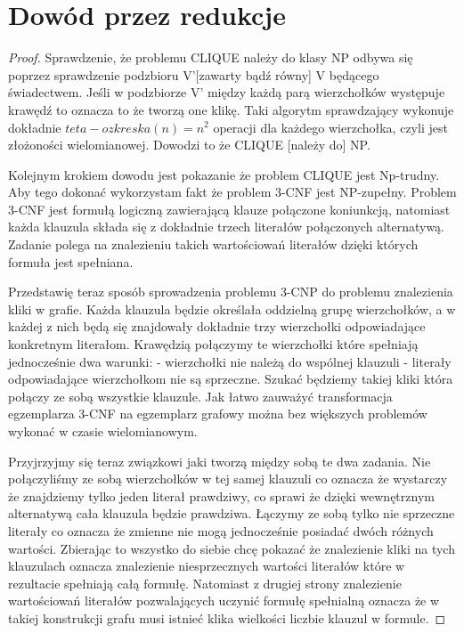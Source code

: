 \section{Dowód przez redukcje}
\begin{proof}
Sprawdzenie, że problemu CLIQUE należy do klasy NP odbywa się poprzez sprawdzenie podzbioru V'[zawarty bądź równy] V będącego świadectwem. Jeśli w podzbiorze V' między każdą parą wierzchołków występuje krawędź to oznacza to że tworzą one klikę. Taki algorytm sprawdzający wykonuje dokładnie  $teta - o zkreska(n) = n^2$ operacji dla każdego wierzchołka, czyli jest złożoności wielomianowej. Dowodzi to że CLIQUE [należy do] NP.

Kolejnym krokiem dowodu jest pokazanie że problem CLIQUE jest Np-trudny. Aby tego dokonać wykorzystam fakt że problem 3-CNF jest NP-zupełny. Problem 3-CNF jest formułą logiczną zawierającą klauze połączone koniunkcją, natomiast każda klauzula składa się z dokładnie trzech literałów połączonych alternatywą. Zadanie polega na znalezieniu takich wartościowań literałów dzięki których formuła jest spełniana. 

Przedstawię teraz sposób sprowadzenia problemu 3-CNP do problemu znalezienia kliki w grafie. Każda klauzula będzie określała oddzielną grupę wierzchołków, a w każdej z nich będą się znajdowały dokładnie trzy wierzchołki odpowiadające konkretnym literałom. Krawędzią połączymy te wierzchołki które spełniają jednocześnie dwa warunki:
- wierzchołki nie należą do wspólnej klauzuli
- literały odpowiadające wierzchołkom nie są sprzeczne.
 Szukać będziemy takiej kliki która połączy ze sobą wszystkie klauzule. Jak łatwo zauważyć transformacja egzemplarza 3-CNF na egzemplarz grafowy można bez większych problemów wykonać w czasie wielomianowym.

Przyjrzyjmy się teraz związkowi jaki tworzą między sobą te dwa zadania. Nie połączyliśmy ze sobą wierzchołków w tej samej klauzuli co oznacza że wystarczy że znajdziemy tylko jeden literał prawdziwy, co sprawi że dzięki wewnętrznym alternatywą cała klauzula będzie prawdziwa. Łączymy ze sobą tylko nie sprzeczne literały co oznacza że zmienne nie mogą jednocześnie posiadać dwóch różnych wartości. Zbierając to wszystko do siebie chcę pokazać że znalezienie kliki na tych klauzulach oznacza znalezienie niesprzecznych wartości literałów które w rezultacie spełniają całą formułę. Natomiast z drugiej strony znalezienie wartościowań literałów pozwalających uczynić formułę spełnialną oznacza że w takiej konstrukcji grafu musi istnieć klika wielkości liczbie klauzul w formule.  




\end{proof}
